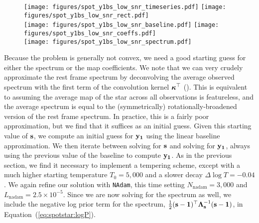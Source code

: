 \documentclass[modern]{aastex62}
\begin{document}
\begin{figure}[p!]
    \begin{centering}
    \texttt{[image: figures/spot\_y1bs\_low\_snr\_timeseries.pdf]}
    \texttt{[image: figures/spot\_y1bs\_low\_snr\_rect.pdf]}
    \\[0.5em]
    \texttt{[image: figures/spot\_y1bs\_low\_snr\_baseline.pdf]}
    \texttt{[image: figures/spot\_y1bs\_low\_snr\_coeffs.pdf]}
    \\[0.5em]
    \texttt{[image: figures/spot\_y1bs\_low\_snr\_spectrum.pdf]}
    \end{centering}
\end{figure}

Because the problem is generally not convex, we need a good starting
guess for either the spectrum or the map coefficients. We note that
we can very crudely approximate the rest frame spectrum by deconvolving the 
average observed spectrum with the first term of the convolution kernel
$\boldsymbol{\kappa}^\top$ ().
This is equivalent to assuming the average map of the star
across all observations is featureless, and the average spectrum is equal
to the (symmetrically) rotationally-broadened version of the rest frame
spectrum. In practice, this is a fairly poor approximation, but we find that it
suffices as an initial guess. Given this starting value of ${\mathbf{s}}$, we 
compute an initial guess for ${\mathbf{y_1}}$ using the linear baseline
approximation. We then iterate between solving for ${\mathbf{s}}$ and
solving for ${\mathbf{y_1}}$, always using the previous value of the 
baseline to compute ${\mathbf{y_1}}$. As in the previous section, we find it
necessary to implement a tempering scheme, except with a much higher
starting temperature $T_0 = 5,000$ and a slower decay $\Delta\log T = -0.04$.
We again refine our solution with \texttt{NAdam}, this time setting
$N_\mathrm{nadam} = 3,000$ and $L_\mathrm{nadam} = 2.5\times 10^{-5}$. Since
we are now solving for the spectrum as well, we include the negative log prior 
term for the spectrum, 
$\frac{1}{2}({\mathbf{s - 1}})^\top \boldsymbol{\Lambda}_{\mathbf{s}}^{-1}({\mathbf{s - 1}})$, 
in Equation~(\ref{eq:spotstar:logP}).
\end{document}
